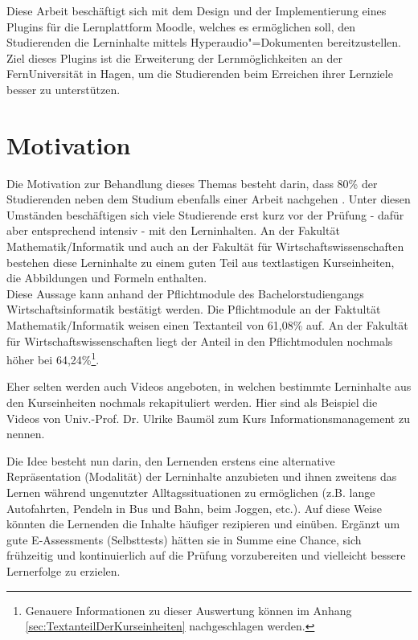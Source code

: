 
\label{cha:einfuehrung}
Diese Arbeit beschäftigt sich mit dem Design und der Implementierung eines Plugins für die Lernplattform Moodle, welches es ermöglichen soll, den Studierenden die Lerninhalte mittels Hyperaudio"=Dokumenten bereitzustellen. Ziel dieses Plugins ist die Erweiterung der Lernmöglichkeiten an der FernUniversität in Hagen, um die Studierenden beim Erreichen ihrer Lernziele besser zu unterstützen. 


\section{Motivation}
\label{sec:motivation}
Die Motivation zur Behandlung dieses Themas besteht darin, dass 
80\% der Studierenden neben dem Studium ebenfalls einer Arbeit nachgehen \citep{fernuniversitaet2018stat}. Unter diesen Umständen beschäftigen sich viele Studierende erst kurz vor der Prüfung - dafür aber entsprechend intensiv - mit den Lerninhalten. An der Fakultät Mathematik/Informatik und auch an der Fakultät für Wirtschaftswissenschaften bestehen diese Lerninhalte zu einem guten Teil aus textlastigen Kurseinheiten, die Abbildungen und Formeln enthalten.\\
Diese Aussage kann anhand der Pflichtmodule des Bachelorstudiengangs Wirtschaftsinformatik bestätigt werden. Die Pflichtmodule an der Faktultät Mathematik/Informatik weisen einen Textanteil von 61,08\% auf. An der Fakultät für Wirtschaftswissenschaften liegt der Anteil in den Pflichtmodulen nochmals höher bei 64,24\%\footnote{Genauere Informationen zu dieser Auswertung können im Anhang \ref{sec:TextanteilDerKurseinheiten} nachgeschlagen werden.}.

Eher selten werden auch Videos angeboten, in welchen bestimmte Lerninhalte aus den Kurseinheiten nochmals rekapituliert werden. Hier sind als Beispiel die Videos von Univ.-Prof. Dr. Ulrike Baumöl zum Kurs \glqq Informationsmanagement\grqq{} zu nennen.

Die Idee besteht nun darin, den Lernenden erstens eine alternative Repräsentation (Modalität) der Lerninhalte anzubieten und ihnen zweitens das Lernen während ungenutzter Alltagssituationen zu ermöglichen (z.B. lange Autofahrten, Pendeln in Bus und Bahn, beim Joggen, etc.). Auf diese Weise könnten die Lernenden die Inhalte häufiger rezipieren und einüben. Ergänzt um gute E-Assessments (Selbsttests) hätten sie in Summe eine Chance, sich frühzeitig und kontinuierlich auf die Prüfung vorzubereiten und vielleicht bessere Lernerfolge zu erzielen. 


